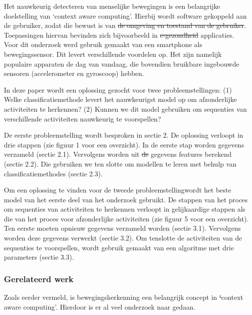 \documentclass{article}
\providecommand{\DIFadd}[1]{{\protect\color{blue}\uwave{#1}}} %
\providecommand{\DIFdel}[1]{{\protect\color{red}\sout{#1}}}                      %
\providecommand{\DIFaddbegin}{} %
\providecommand{\DIFaddend}{} %
\providecommand{\DIFdelbegin}{} %
\providecommand{\DIFdelend}{} %
\begin{document}
Het nauwkeurig detecteren van menselijke bewegingen is een belangrijke doelstelling van `context aware computing'. Hierbij wordt software gekoppeld aan de gebruiker, zodat die bewust is van \DIFdelbegin \DIFdel{de omgeving en toestand van de gebruiker}\DIFdelend \DIFaddbegin \DIFadd{zijn toestand en omgeving}\DIFaddend . Toepassingen hiervan bevinden zich bijvoorbeeld in \DIFdelbegin \DIFdel{e-gezondheid }\DIFdelend \DIFaddbegin \DIFadd{e-health }\DIFaddend applicaties. Voor dit onderzoek werd gebruik gemaakt van een smartphone als bewegingssensor. Dit levert verschillende voordelen op. Het zijn namelijk populaire apparaten de dag van vandaag, die bovendien bruikbare ingebouwde sensoren (accelerometer en gyroscoop) hebben.

In deze paper wordt een oplossing gezocht voor twee probleemstellingen: (1) Welke classificatiemethode levert het nauwkeurigst model op om afzonderlijke activiteiten te herkennen? (2) Kunnen we dit model gebruiken om sequenties van verschillende activiteiten nauwkeurig te voorspellen?

De eerste probleemstelling wordt besproken in sectie 2. De oplossing verloopt in drie stappen (zie figuur 1 voor een overzicht). In de eerste stap worden gegevens verzameld (sectie 2.1). Vervolgens worden uit \DIFdelbegin \DIFdel{de }\DIFdelend \DIFaddbegin \DIFadd{die }\DIFaddend gegevens features berekend (sectie 2.2). Die gebruiken we ten slotte om modellen te leren met behulp van classificatiemethodes (sectie 2.3).

Om een oplossing te vinden voor de tweede probleemstelling\DIFaddbegin \DIFadd{, }\DIFaddend wordt het beste model van het eerste deel van het onderzoek gebruikt. De stappen van het proces om sequenties van activiteiten te herkennen verloopt in gelijkaardige stappen als die van het proces voor afzonderlijke activiteiten (zie figuur 5 voor een overzicht). Ten eerste moeten opnieuw gegevens verzameld worden (sectie 3.1). Vervolgens worden deze gegevens verwerkt (sectie 3.2). Om tenslotte de activiteiten van de sequenties te voorspellen, wordt gebruik gemaakt van een algoritme met drie parameters (sectie 3.3).

\subsubsection{Gerelateerd werk}

Zoals eerder vermeld, is bewegingsherkenning een belangrijk concept in \DIFdelbegin \DIFdel{'}\DIFdelend \DIFaddbegin \DIFadd{`}\DIFaddend context aware computing'. Hierdoor is er al veel onderzoek naar gedaan.
\end{document}
